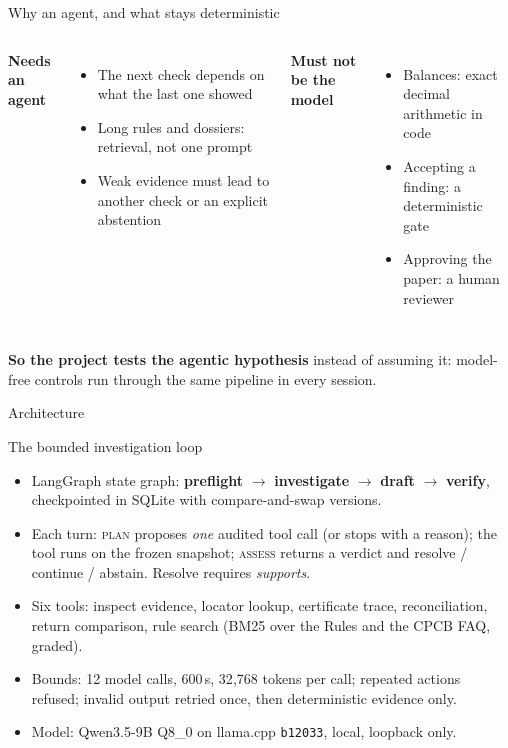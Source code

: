 \documentclass[aspectratio=169,11pt,t]{beamer}
\begin{document}
\begin{frame}{Why an agent, and what stays deterministic}
\begin{columns}[T]
\textbf{Needs an agent}
\begin{itemize}
\item The next check depends on what the last one showed
\item Long rules and dossiers: retrieval, not one prompt
\item Weak evidence must lead to another check or an explicit abstention
\end{itemize}
\textbf{Must not be the model}
\begin{itemize}
\item Balances: exact decimal arithmetic in code
\item Accepting a finding: a deterministic gate
\item Approving the paper: a human reviewer
\end{itemize}
\end{columns}
\vspace{0.8em}
\textbf{So the project tests the agentic hypothesis} instead of assuming it: model-free controls run
through the same pipeline in every session.
\end{frame}

\begin{frame}{Architecture}
\centering
\resizebox{!}{0.82\textheight}{}
\end{frame}

\begin{frame}{The bounded investigation loop}
\begin{itemize}
\item LangGraph state graph: \textbf{preflight} $\rightarrow$ \textbf{investigate} $\rightarrow$
\textbf{draft} $\rightarrow$ \textbf{verify}, checkpointed in SQLite with compare-and-swap versions.
\item Each turn: \textsc{plan} proposes \emph{one} audited tool call (or stops with a reason);
the tool runs on the frozen snapshot; \textsc{assess} returns a verdict and resolve / continue /
abstain. Resolve requires \emph{supports}.
\item Six tools: inspect evidence, locator lookup, certificate trace, reconciliation, return
comparison, rule search (BM25 over the Rules and the CPCB FAQ, graded).
\item Bounds: 12 model calls, 600\,s, 32{,}768 tokens per call; repeated actions refused; invalid
output retried once, then deterministic evidence only.
\item Model: Qwen3.5-9B Q8\_0 on llama.cpp \texttt{b12033}, local, loopback only.
\end{itemize}
\end{frame}
\end{document}
